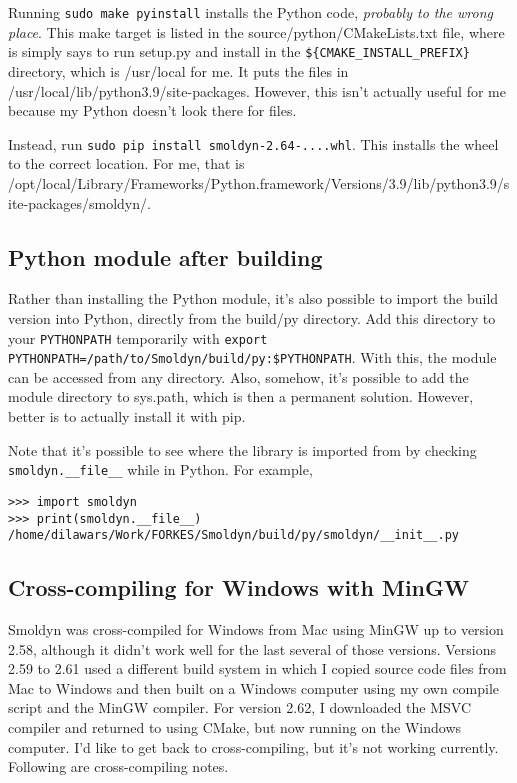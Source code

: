 \documentclass {scrbook}
\newcommand {\ttt} {\texttt}
\begin{document}
Running \ttt{sudo make pyinstall} installs the Python code, \textit{probably to the wrong place}. This make target is listed in the source/python/CMakeLists.txt file, where is simply says to run setup.py and install in the \ttt{\$\{CMAKE\_INSTALL\_PREFIX\}} directory, which is /usr/local for me. It puts the files in /usr/local/lib/python3.9/site-packages. However, this isn't actually useful for me because my Python doesn't look there for files.

Instead, run \ttt{sudo pip install smoldyn-2.64-....whl}. This installs the wheel to the correct location. For me, that is /opt/local/Library/Frameworks/Python.framework/Versions/3.9/lib/python3.9/site-packages/smoldyn/.

\subsection{Python module after building}

Rather than installing the Python module, it's also possible to import the build version into Python, directly from the build/py directory. Add this directory to your \ttt{PYTHONPATH} temporarily with \ttt{export PYTHONPATH=/path/to/Smoldyn/build/py:\$PYTHONPATH}. With this, the module can be accessed from any directory. Also, somehow, it's possible to add the module directory to sys.path, which is then a permanent solution. However, better is to actually install it with pip.

Note that it's possible to see where the library is imported from by checking
\verb|smoldyn.__file__| while in Python. For example,

\begin{verbatim}
>>> import smoldyn
>>> print(smoldyn.__file__)
/home/dilawars/Work/FORKES/Smoldyn/build/py/smoldyn/__init__.py
\end{verbatim}


\subsection{Cross-compiling for Windows with MinGW}

Smoldyn was cross-compiled for Windows from Mac using MinGW up to version 2.58, although it didn't work well for the last several of those versions. Versions 2.59 to 2.61 used a different build system in which I copied source code files from Mac to Windows and then built on a Windows computer using my own compile script and the MinGW compiler. For version 2.62, I downloaded the MSVC compiler and returned to using CMake, but now running on the Windows computer. I'd like to get back to cross-compiling, but it's not working currently. Following are cross-compiling notes.
\end{document}

